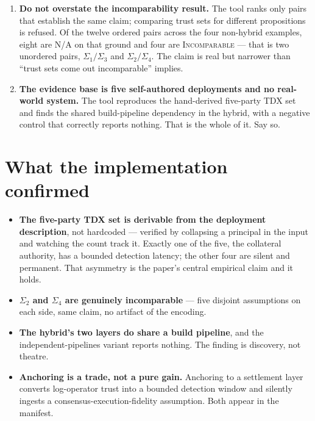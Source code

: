 \documentclass[11pt]{article}
\newcommand{\keypoint}[1]{\textbf{#1}}
\begin{document}
\begin{enumerate}
Both are fixed and pinned by tests. The paper should state plainly that the
comparison is order-independent and duration-normalised \keypoint{by
construction}, because two independent encoders writing \texttt{12h} and
\texttt{720m} is not a hypothetical.

\item \keypoint{Do not overstate the incomparability result.} The tool ranks
only pairs that establish the same claim; comparing trust sets for different
propositions is refused. Of the twelve ordered pairs across the four non-hybrid
examples, eight are N/A on that ground and four are \textsc{Incomparable} ---
that is two unordered pairs, $\Sigma_1/\Sigma_3$ and $\Sigma_2/\Sigma_4$. The
claim is real but narrower than ``trust sets come out incomparable'' implies.

\item \keypoint{The evidence base is five self-authored deployments and no
real-world system.} The tool reproduces the hand-derived five-party TDX set and
finds the shared build-pipeline dependency in the hybrid, with a negative
control that correctly reports nothing. That is the whole of it. Say so.

\end{enumerate}

\section*{What the implementation confirmed}

\begin{itemize}
  \item \keypoint{The five-party TDX set is derivable from the deployment
    description}, not hardcoded --- verified by collapsing a principal in the
    input and watching the count track it. Exactly one of the five, the
    collateral authority, has a bounded detection latency; the other four are
    silent and permanent. That asymmetry is the paper's central empirical claim
    and it holds.
  \item \keypoint{$\Sigma_2$ and $\Sigma_4$ are genuinely incomparable} --- five
    disjoint assumptions on each side, same claim, no artifact of the encoding.
  \item \keypoint{The hybrid's two layers do share a build pipeline}, and the
    independent-pipelines variant reports nothing. The finding is discovery, not
    theatre.
  \item \keypoint{Anchoring is a trade, not a pure gain.} Anchoring to a
    settlement layer converts log-operator trust into a bounded detection window
    and silently ingests a consensus-execution-fidelity assumption. Both appear
    in the manifest.
\end{itemize}
\end{document}
